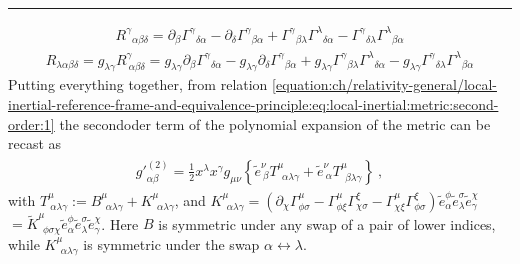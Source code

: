 \documentclass[letterpaper,10pt,english]{jupyterBook}
\begin{document}
\bigskip\hrule\bigskip

\begin{equation*}
\begin{split}R^\gamma{}_{\alpha\beta\delta}=\partial_\beta\Gamma^\gamma{}_{\delta\alpha}-\partial_\delta\Gamma^\gamma{}_{\beta\alpha}+\Gamma^\gamma{}_{\beta\lambda}\Gamma^\lambda{}_{\delta\alpha}-\Gamma^\gamma{}_{\delta\lambda}\Gamma^\lambda{}_{\beta\alpha}\end{split}
\end{equation*}\begin{equation*}
\begin{split}R_{\lambda\alpha\beta\delta}=g_{\lambda \gamma} R^{\gamma}_{\ \alpha\beta\delta} = g_{\lambda \gamma} \partial_\beta\Gamma^\gamma{}_{\delta\alpha}-g_{\lambda \gamma} \partial_\delta\Gamma^\gamma{}_{\beta\alpha}+g_{\lambda \gamma} \Gamma^\gamma{}_{\beta\lambda}\Gamma^\lambda{}_{\delta\alpha}-g_{\lambda \gamma} \Gamma^\gamma{}_{\delta\lambda}\Gamma^\lambda{}_{\beta\alpha}\end{split}
\end{equation*}
\sphinxAtStartPar
Putting everything together, from relation \eqref{equation:ch/relativity-general/local-inertial-reference-frame-and-equivalence-principle:eq:local-inertial:metric:second-order:1} the second\sphinxhyphen{}oder term of the polynomial expansion of the metric can be recast as
\begin{equation*}
\begin{split}\begin{aligned}
 {g'}^{(2)}_{\alpha \beta}
 = \frac{1}{2} x^{\lambda} x^{\gamma} g_{\mu \nu}
 \left\{ 
  \widetilde{e}^{\nu}_{\ \beta } T^{\mu}_{\ \ \alpha \lambda \gamma} + 
  \widetilde{e}^{\nu}_{\ \alpha} T^{\mu}_{\ \ \beta  \lambda \gamma}   
 \right\} \ ,
\end{aligned}\end{split}
\end{equation*}
\sphinxAtStartPar
with \(T^{\mu}_{\ \alpha \lambda \gamma} := B^{\mu}_{\ \ \alpha \lambda \gamma} + K^{\mu}_{\ \ \alpha \lambda \gamma}\), and \(K^{\mu}_{\ \ \alpha \lambda \gamma} = \left( \partial_{\chi} \Gamma^{\mu}_{\phi \sigma} - \Gamma^{\mu}_{\phi \xi} \Gamma^{\xi}_{\chi \sigma} - \Gamma^{\mu}_{\chi \xi} \Gamma^{\xi}_{\phi \sigma} \right) \widetilde{e}^{\phi}_{\alpha} \widetilde{e}^{\sigma}_{\lambda} \widetilde{e}^{\chi}_{\gamma}\) \(= \widetilde{K}^{\mu}_{\ \ \phi \sigma \chi} \widetilde{e}^{\phi}_{\alpha} \widetilde{e}^{\sigma}_{\lambda} \widetilde{e}^{\chi}_{\gamma}\). Here \(B\) is symmetric under any swap of a pair of lower indices, while \(K^{\mu}_{\ \ \alpha \lambda \gamma}\) is symmetric under the swap \(\alpha \leftrightarrow \lambda\).
\end{document}
